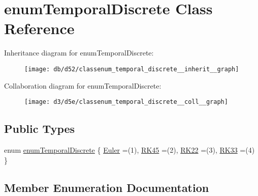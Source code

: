\hypertarget{classenum_temporal_discrete}{}\section{enum\+Temporal\+Discrete Class Reference}
\label{classenum_temporal_discrete}


Inheritance diagram for enum\+Temporal\+Discrete\+:
\nopagebreak
\begin{figure}[H]
\begin{center}
\leavevmode
\texttt{[image: db/d52/classenum\_temporal\_discrete\_\_inherit\_\_graph]}
\end{center}
\end{figure}


Collaboration diagram for enum\+Temporal\+Discrete\+:
\nopagebreak
\begin{figure}[H]
\begin{center}
\leavevmode
\texttt{[image: d3/d5e/classenum\_temporal\_discrete\_\_coll\_\_graph]}
\end{center}
\end{figure}
\subsection*{Public Types}
\begin{DoxyCompactItemize}
\item 
enum \hyperlink{classenum_temporal_discrete_ad94cd5502302aff98ce211de9897fa3e}{enum\+Temporal\+Discrete} \{ \hyperlink{classenum_temporal_discrete_ad94cd5502302aff98ce211de9897fa3eac445e0a44f79d563f6ff6395c60d5715}{Euler} =(1), 
\hyperlink{classenum_temporal_discrete_ad94cd5502302aff98ce211de9897fa3ea6906c7cc44f5c8693e7212d54dff9efa}{R\+K45} =(2), 
\hyperlink{classenum_temporal_discrete_ad94cd5502302aff98ce211de9897fa3eaeb096c35bcee34d89b6a216ad714cbc0}{R\+K22} =(3), 
\hyperlink{classenum_temporal_discrete_ad94cd5502302aff98ce211de9897fa3ea16753bdc847787f001e0f79bf685a57c}{R\+K33} =(4)
 \}
\end{DoxyCompactItemize}


\subsection{Member Enumeration Documentation}
\mbox{\label{classenum_temporal_discrete_ad94cd5502302aff98ce211de9897fa3e}} 
